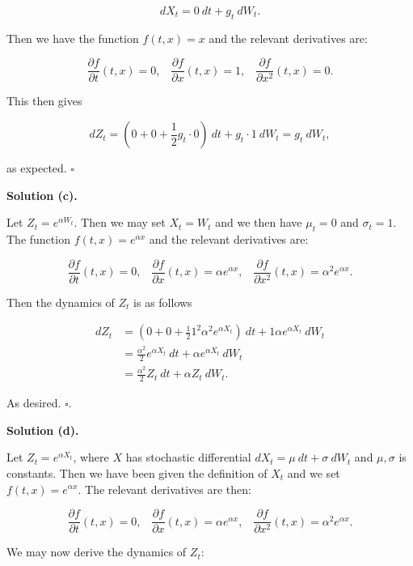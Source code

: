 \documentclass[
]{article}
\begin{document}
\[
dX_t=0\ dt+g_t\ dW_t.
\]

Then we have the function \(f(t,x)=x\) and the relevant derivatives are:

\[
\frac{\partial f}{\partial t}(t,x)=0,\hspace{10pt}\frac{\partial f}{\partial x}(t,x) =1,\hspace{10pt}\frac{\partial f}{\partial x^2}(t,x) =0.
\]

This then gives

\[
dZ_t=\left(0+0+\frac{1}{2}g_t\cdot 0\right)\ dt + g_t\cdot 1\ dW_t=g_t\ dW_t,
\]

as expected. \(\square\)

\textbf{Solution (c).}

Let \(Z_t=e^{\alpha W_t}\). Then we may set \(X_t=W_t\) and we then have
\(\mu_t=0\) and \(\sigma_t=1\). The function \(f(t,x)=e^{\alpha x}\) and
the relevant derivatives are:

\[
\frac{\partial f}{\partial t}(t,x)=0,\hspace{10pt}\frac{\partial f}{\partial x}(t,x) =\alpha e^{\alpha x},\hspace{10pt}\frac{\partial f}{\partial x^2}(t,x) =\alpha^2 e^{\alpha x}.
\]

Then the dynamics of \(Z_t\) is as follows

\begin{align*}
dZ_t&=\left(0+0+\frac{1}{2}1^2\alpha^2e^{\alpha X_t}\right)\ dt + 1\alpha e^{\alpha X_t}\ dW_t\\
&=\frac{\alpha^2}{2}e^{\alpha X_t}\ dt +\alpha e^{\alpha X_t}\ dW_t\\
&=\frac{\alpha^2}{2}Z_t\ dt +\alpha Z_t\ dW_t.
\end{align*}

As desired. \(\square\).

\textbf{Solution (d).}

Let \(Z_t=e^{\alpha X_t}\), where \(X\) has stochastic differential
\(dX_t=\mu\ dt + \sigma\ dW_t\) and \(\mu,\sigma\) is constants. Then we
have been given the definition of \(X_t\) and we set
\(f(t,x)=e^{\alpha x}\). The relevant derivatives are then:

\[
\frac{\partial f}{\partial t}(t,x)=0,\hspace{10pt}\frac{\partial f}{\partial x}(t,x) =\alpha e^{\alpha x},\hspace{10pt}\frac{\partial f}{\partial x^2}(t,x) =\alpha^2 e^{\alpha x}.
\]

We may now derive the dynamics of \(Z_t\):
\end{document}

